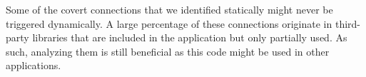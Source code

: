 Some of the covert connections that we identified statically might never be triggered dynamically. 
A large percentage of these connections originate in  
third-party libraries that are included in the application but only partially used. 
As such, analyzing them is still beneficial as this code might be used in other applications.
